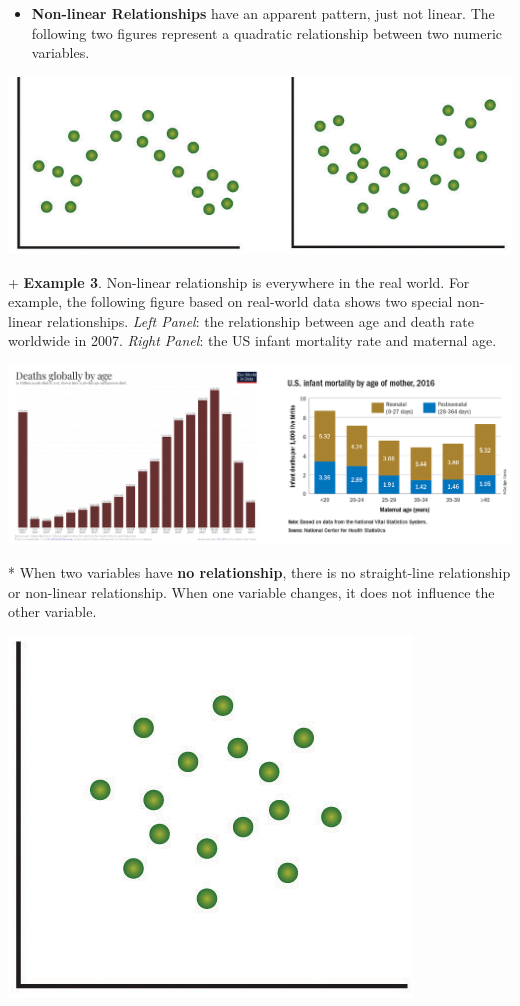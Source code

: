 \documentclass[
]{book}
\providecommand{\tightlist}{%
  \setlength{\itemsep}{0pt}\setlength{\parskip}{0pt}}
\begin{document}
\begin{itemize}
\tightlist
\item
  \textbf{Non-linear Relationships} have an apparent pattern, just not linear. The following two figures represent a quadratic relationship between two numeric variables. \\
\end{itemize}

\begin{center}\includegraphics[width=0.6\linewidth]{week12/curveLinear} \end{center}

\hfill\break
+ \textbf{Example 3}. Non-linear relationship is everywhere in the real world. For example, the following figure based on real-world data shows two special non-linear relationships. \emph{Left Panel}: the relationship between age and death rate worldwide in 2007. \emph{Right Panel}: the US infant mortality rate and maternal age.
~

\begin{center}\includegraphics[width=0.8\linewidth]{week12/deathRates} \end{center}

\hfill\break
* When two variables have \textbf{no relationship}, there is no straight-line relationship or non-linear relationship. When one variable changes, it does not influence the other variable.\\

\begin{center}\includegraphics[width=0.25\linewidth]{week12/uncorrelated} \end{center}
\end{document}
